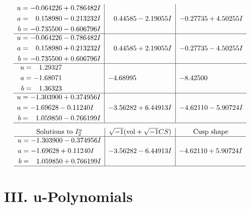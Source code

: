 \documentclass[1p]{elsarticle_modified}
\theoremstyle{definition}
\newcommand{\I}{\sqrt{-1}}
\begin{document}
$$\begin{array}{c|c|c}
\begin{aligned}
u &= -0.064226 + 0.786482 I \\
a &= \phantom{-}0.158980 - 0.213232 I \\
b &= -0.735500 - 0.606796 I\end{aligned}
 & \phantom{-}0.44585 - 2.19055 I & -0.27735 + 4.50255 I \\ \hline\begin{aligned}
u &= -0.064226 - 0.786482 I \\
a &= \phantom{-}0.158980 + 0.213232 I \\
b &= -0.735500 + 0.606796 I\end{aligned}
 & \phantom{-}0.44585 + 2.19055 I & -0.27735 - 4.50255 I \\ \hline\begin{aligned}
u &= \phantom{-}1.29327\phantom{ +0.000000I} \\
a &= -1.68071\phantom{ +0.000000I} \\
b &= \phantom{-}1.36323\phantom{ +0.000000I}\end{aligned}
 & -4.68995\phantom{ +0.000000I} & -8.42500\phantom{ +0.000000I} \\ \hline\begin{aligned}
u &= -1.303900 + 0.374956 I \\
a &= -1.69628 - 0.11240 I \\
b &= \phantom{-}1.059850 - 0.766199 I\end{aligned}
 & -3.56282 + 6.44913 I & -4.62110 - 5.90724 I\\
 \hline 
 \end{array}$$\newpage$$\begin{array}{c|c|c}  
\text{Solutions to }I^u_{2}& \I (\text{vol} + \sqrt{-1}CS) & \text{Cusp shape}\\
 \hline 
\begin{aligned}
u &= -1.303900 - 0.374956 I \\
a &= -1.69628 + 0.11240 I \\
b &= \phantom{-}1.059850 + 0.766199 I\end{aligned}
 & -3.56282 - 6.44913 I & -4.62110 + 5.90724 I\\
 \hline 
 \end{array}$$\newpage
\newpage\renewcommand{\arraystretch}{1}
\centering \section*{ III. u-Polynomials}
\end{document}
